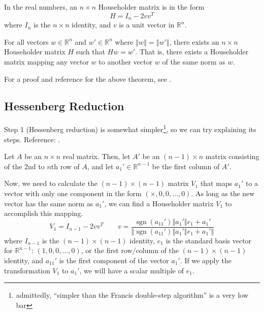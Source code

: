 \documentclass{article}
\DeclareMathOperator{\sgn}{sgn}
\begin{document}
\begin{tcolorbox}[title={Householder transformation},colback=blue!5!white,colframe=blue!75!black,parbox=false]
	In the real numbers, an $n\times n$ Householder matrix is in the form
	\begin{equation*}
	    H=I_n - 2 v v ^T
	\end{equation*}
	where $I_n$ is the $n\times n$ identity, and $v$ is a unit vector in $\mathbb R^n$.

	For all vectors $w\in\mathbb R^n$ and $w'\in\mathbb R^n$ where $\left\Vert w\right\Vert=\left\Vert w'\right\Vert$, there exists an $n\times n$ Householder matrix $H$ such that $Hw=w'$. That is, there exists a Householder matrix mapping any vector $w$ to another vector $w$ of the same norm as $w$.

	For a proof and reference for the above theorem, see \cite{cambridge}.
\end{tcolorbox}

\subsection{Hessenberg Reduction}
Step 1 (Hessenberg reduction) is somewhat simpler\footnote{admittedly, ``simpler than the Francis double-step algorithm'' is a very low bar}, so we can try explaining its steps. Reference: \cite{wikipedia}.

Let $A$ be an $n\times n$ real matrix. Then, let $A'$ be an $(n-1)\times n$ matrix consisting of the $2$nd to $n$th row of $A$, and let $a_1'\in\mathbb R^{n-1}$ be the first column of $A'$.

Now, we need to calculate the $(n-1)\times(n-1)$ matrix $V_1$ that maps $a_1'$ to a vector with only one component in the form $(\times, 0, 0, \ldots, 0)$. As long as the new vector has the same norm as $a_1'$, we can find a Householder matrix $V_1$ to accomplish this mapping.
\begin{equation}
	V_1=I_{n-1}-2vv^T \qquad
	v=\frac{\sgn \left(a_{11}'\right) \left\Vert a_1' \right\Vert e_1+a_1'}{\left\Vert \sgn \left(a_{11}'\right) \left\Vert a_1' \right\Vert e_1+a_1' \right\Vert}
\end{equation}
where $I_{n-1}$ is the $(n-1)\times(n-1)$ identity, $e_1$ is the standard basis vector for $\mathbb R^{n-1}$: $(1,0,0,\ldots,0)$, or the first row/column of the $(n-1)\times (n-1)$ identity, and $a_{11}'$ is the first component of the vector $a_1'$. If we apply the transformation $V_1$ to $a_1'$, we will have a scalar multiple of $e_1$.
\end{document}
